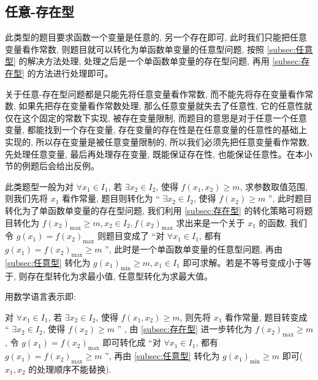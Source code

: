 \subsection{任意-存在型}\label{subsec:任意-存在型}
此类型的题目要求函数一个变量是任意的, 另一个存在即可, 此时我们只能把任意变量看作常数, 则题目就可以转化为单函数单变量的任意型问题, 按照 \ref{subsec:任意型} 的解决方法处理, 处理之后是一个单函数单变量的存在型问题, 再用 \ref{subsec:存在型} 的方法进行处理即可。

关于任意-存在型问题都是只能先将任意变量看作常数, 而不能先将存在变量看作常数, 如果先把存在变量看作常数处理, 那么任意变量就失去了任意性, 它的任意性就仅在这个固定的常数下实现, 被存在变量限制, 而题目的意思是对于任意一个任意变量, 都能找到一个存在变量, 存在变量的存在性是在任意变量的任意性的基础上实现的, 所以存在变量是被任意变量限制的, 所以我们必须先把任意变量看作常数, 先处理任意变量, 最后再处理存在变量, 既能保证存在性, 也能保证任意性。在本小节的例题后会给出反例。

此类题型一般为对 \(\forall {x}_{1} \in  {I}_{1}\), 若 \(\exists {x}_{2} \in  {I}_{2}\), 使得 \(f(x_1, x_2)  \geq  m\), 求参数取值范围, 则我们先将 \({x}_{1}\) 看作常量, 题目则转化为 “ \(\exists {x}_{2} \in  {I}_{2}\), 使得 \(f\left( {x}_{2}\right)  \geq  m\) ”, 此时题目转化为了单函数单变量的存在型问题, 我们利用 \ref{subsec:存在型} 的转化策略可将题目转化为 \(f{\left( {x}_{2}\right) }_{\max } \geq  m, {x}_{2} \in  {I}_{2}, f{\left( {x}_{2}\right) }_{\max }\) 求出来是一个关于 \({x}_{1}\) 的函数, 我们令 \(g\left( {x}_{1}\right)  = f{\left( {x}_{2}\right) }_{\max }\) 则题目变成了 “对 \(\forall {x}_{1} \in  {I}_{1}\), 都有 \(g\left( {x}_{1}\right)  = f{\left( {x}_{2}\right) }_{\max } \geq  m\) ”, 此时是一个单函数单变量的任意型问题, 再由 \ref{subsec:任意型} 转化为 \(g{\left( {x}_{1}\right) }_{\min } \geq  m, {x}_{1} \in  {I}_{1}\) 即可求解。若是不等号变成小于等于, 则存在型转化为求最小值, 任意型转化为求最大值。

用数学语言表示即:

\begin{type}\label{type:7}
  对 \(\forall {x}_{1} \in  {I}_{1}\), 若 \(\exists {x}_{2} \in  {I}_{2}\), 使得 \(f(x_1, x_2)  \geq  m\), 则先将 \({x}_{1}\) 看作常量, 题目转变成 “ \(\exists {x}_{2} \in  {I}_{2}\), 使得 \(f\left( {x}_{2}\right)  \geq  m\) ” , 由 \ref{subsec:存在型} 进一步转化为 \(f{\left( {x}_{2}\right) }_{\max } \geq  m\), 令 \(g\left( {x}_{1}\right)  = f{\left( {x}_{2}\right) }_{\max }\) 即可转化成 “对 \(\forall {x}_{1} \in  {I}_{1}\), 都有 \(g\left( {x}_{1}\right)  = f{\left( {x}_{2}\right) }_{\max } \geq  m\) ”, 再由 \ref{subsec:任意型} 转化为 \(g{\left( {x}_{1}\right) }_{\min } \geq  m\) 即可( \({x}_{1}, {x}_{2}\) 的处理顺序不能替换).
\end{type}

